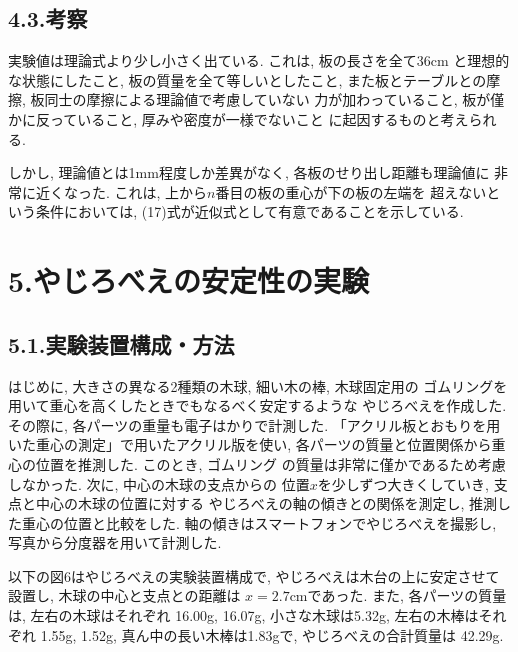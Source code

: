 \documentclass{jlreq}
\begin{document}
\subsection*{4.3.考察}

実験値は理論式より少し小さく出ている. これは, 板の長さを全て36cm
と理想的な状態にしたこと, 板の質量を全て等しいとしたこと, 
また板とテーブルとの摩擦, 板同士の摩擦による理論値で考慮していない
力が加わっていること, 板が僅かに反っていること, 厚みや密度が一様でないこと
に起因するものと考えられる. \par

しかし, 理論値とは1mm程度しか差異がなく, 各板のせり出し距離も理論値に
非常に近くなった. これは, 上から$n$番目の板の重心が下の板の左端を
超えないという条件においては, (17)式が近似式として有意であることを示している.






\section*{5.やじろべえの安定性の実験}


\subsection*{5.1.実験装置構成・方法}

はじめに, 大きさの異なる2種類の木球, 細い木の棒, 木球固定用の
ゴムリングを用いて重心を高くしたときでもなるべく安定するような
やじろべえを作成した. その際に, 各パーツの重量も電子はかりで計測した.
「アクリル板とおもりを用いた重心の測定」で用いたアクリル版を使い, 
各パーツの質量と位置関係から重心の位置を推測した. このとき, ゴムリング
の質量は非常に僅かであるため考慮しなかった. 次に, 中心の木球の支点からの
位置$x$を少しずつ大きくしていき, 支点と中心の木球の位置に対する
やじろべえの軸の傾きとの関係を測定し, 推測した重心の位置と比較をした.
軸の傾きはスマートフォンでやじろべえを撮影し, 
写真から分度器を用いて計測した. \par

以下の図6はやじろべえの実験装置構成で, 
やじろべえは木台の上に安定させて設置し, 木球の中心と支点との距離は
$x = 2.7$cmであった. また, 各パーツの質量は, 左右の木球はそれぞれ
16.00g, 16.07g, 小さな木球は5.32g, 左右の木棒はそれぞれ
1.55g, 1.52g, 真ん中の長い木棒は1.83gで, やじろべえの合計質量は
42.29g.
\end{document}

